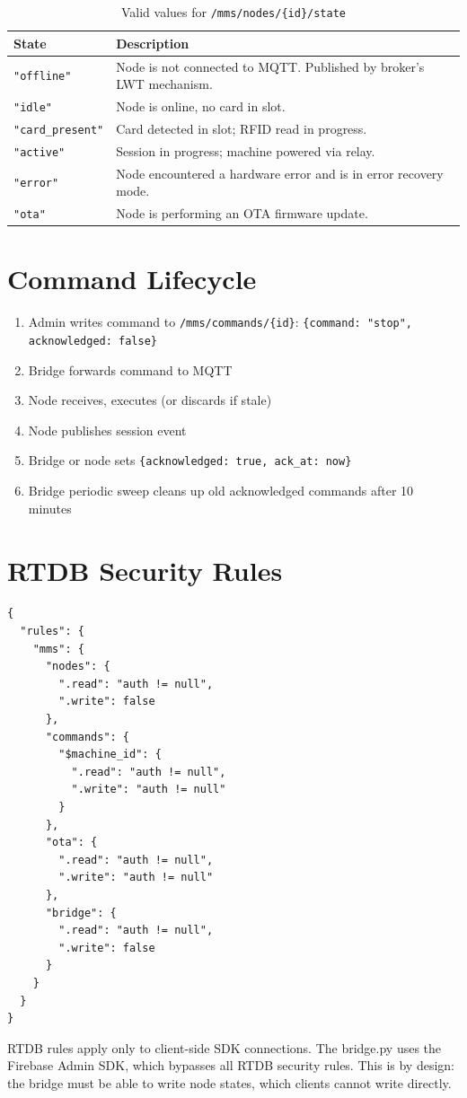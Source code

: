\begin{table}[H]
\centering
\caption{Valid values for \texttt{/mms/nodes/\{id\}/state}}
\begin{tabular}{L{4cm}L{10cm}}
\toprule
\textbf{State} & \textbf{Description} \\
\midrule
\texttt{"offline"} & Node is not connected to MQTT. Published by broker's LWT mechanism. \\
\texttt{"idle"} & Node is online, no card in slot. \\
\texttt{"card\_present"} & Card detected in slot; RFID read in progress. \\
\texttt{"active"} & Session in progress; machine powered via relay. \\
\texttt{"error"} & Node encountered a hardware error and is in error recovery mode. \\
\texttt{"ota"} & Node is performing an OTA firmware update. \\
\bottomrule
\end{tabular}
\end{table}

\section{Command Lifecycle}

\begin{enumerate}[leftmargin=1.5em]
    \item Admin writes command to \texttt{/mms/commands/\{id\}}: \texttt{\{command: "stop", acknowledged: false\}}
    \item Bridge forwards command to MQTT
    \item Node receives, executes (or discards if stale)
    \item Node publishes session event
    \item Bridge or node sets \texttt{\{acknowledged: true, ack\_at: now\}}
    \item Bridge periodic sweep cleans up old acknowledged commands after 10 minutes
\end{enumerate}

\section{RTDB Security Rules}

\begin{lstlisting}[caption={v2/database.rules.json}]
{
  "rules": {
    "mms": {
      "nodes": {
        ".read": "auth != null",
        ".write": false
      },
      "commands": {
        "$machine_id": {
          ".read": "auth != null",
          ".write": "auth != null"
        }
      },
      "ota": {
        ".read": "auth != null",
        ".write": "auth != null"
      },
      "bridge": {
        ".read": "auth != null",
        ".write": false
      }
    }
  }
}
\end{lstlisting}

\begin{notebox}
RTDB rules apply only to client-side SDK connections. The bridge.py uses the Firebase Admin SDK, which bypasses all RTDB security rules. This is by design: the bridge must be able to write node states, which clients cannot write directly.
\end{notebox}
